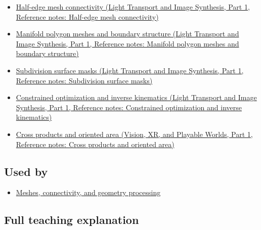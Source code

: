 \hypertarget{appendix-7107009c505b-prerequisites}{}

\begin{itemize}
\tightlist
\item
  \href{../04-Light-Transport-and-Image-Synthesis-P01/main.pdf\#appendix-1aea26b2307f}{Half-edge mesh connectivity (Light Transport and Image Synthesis, Part 1, Reference notes: Half-edge mesh connectivity)}
\item
  \href{../04-Light-Transport-and-Image-Synthesis-P01/main.pdf\#appendix-fab348609369}{Manifold polygon meshes and boundary structure (Light Transport and Image Synthesis, Part 1, Reference notes: Manifold polygon meshes and boundary structure)}
\item
  \href{../04-Light-Transport-and-Image-Synthesis-P01/main.pdf\#appendix-0234ab7f86b1}{Subdivision surface masks (Light Transport and Image Synthesis, Part 1, Reference notes: Subdivision surface masks)}
\item
  \href{../04-Light-Transport-and-Image-Synthesis-P01/main.pdf\#appendix-29f4bea4c2bb}{Constrained optimization and inverse kinematics (Light Transport and Image Synthesis, Part 1, Reference notes: Constrained optimization and inverse kinematics)}
\item
  \href{../07-Vision-XR-and-Playable-Worlds-P01/main.pdf\#appendix-2391db8052b1}{Cross products and oriented area (Vision, XR, and Playable Worlds, Part 1, Reference notes: Cross products and oriented area)}
\end{itemize}

\subsection{Used by}\label{appendix-7107009c505b-used-by}

\hypertarget{appendix-7107009c505b-used-by}{}

\begin{itemize}
\tightlist
\item
  \hyperref[03-visual-computing-i-ch002-meshes-connectivity-and-geometry-processing]{Meshes, connectivity, and geometry processing}
\end{itemize}

\subsection{Full teaching explanation}\label{appendix-7107009c505b-full-teaching-explanation}

\hypertarget{appendix-7107009c505b-full-teaching-explanation}{}

